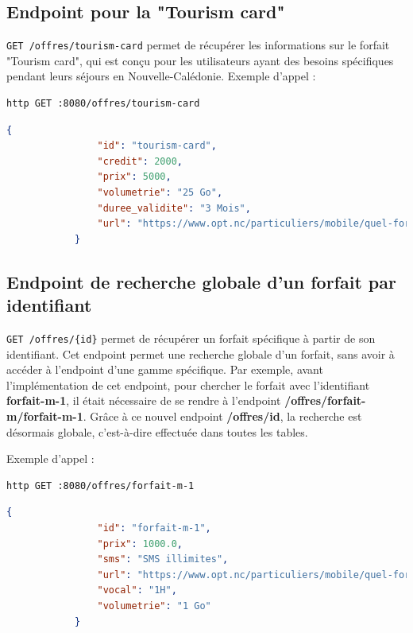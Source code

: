 \documentclass[11pt]{article}
\begin{document}
		\subsection*{Endpoint pour la "Tourism card"}
		\texttt{GET /offres/tourism-card} permet de récupérer les informations sur le forfait "Tourism card", qui est conçu pour les utilisateurs ayant des besoins spécifiques pendant leurs séjours en Nouvelle-Calédonie.
		Exemple d'appel :
		\begin{lstlisting}[language=bash]
			http GET :8080/offres/tourism-card
		\end{lstlisting}
		\begin{lstlisting}[language=JSON]
			{
				"id": "tourism-card",
				"credit": 2000,
				"prix": 5000,
				"volumetrie": "25 Go",
				"duree_validite": "3 Mois",
				"url": "https://www.opt.nc/particuliers/mobile/quel-forfait-choisir/tourism-card-1000"
			}
		\end{lstlisting}
		
	
		
		\subsection*{Endpoint de recherche globale d'un forfait par identifiant}
		
		\texttt{GET /offres/\{id\}} permet de récupérer un forfait spécifique à partir de son identifiant. Cet endpoint permet une recherche globale d'un forfait, sans avoir à accéder à l'endpoint d'une gamme spécifique. Par exemple, avant l'implémentation de cet endpoint, pour chercher le forfait avec l'identifiant \textbf{forfait-m-1}, il était nécessaire de se rendre à l'endpoint \textbf{/offres/forfait-m/forfait-m-1}. Grâce à ce nouvel endpoint \textbf{/offres/{id}}, la recherche est désormais globale, c'est-à-dire effectuée dans toutes les tables.
	
		
			Exemple d'appel :
		\begin{lstlisting}[language=bash]
			http GET :8080/offres/forfait-m-1
		\end{lstlisting}
		\begin{lstlisting}[language=JSON]
			{
				"id": "forfait-m-1",
				"prix": 1000.0,
				"sms": "SMS illimites",
				"url": "https://www.opt.nc/particuliers/mobile/quel-forfait-choisir/forfait-m-1-go",
				"vocal": "1H",
				"volumetrie": "1 Go"
			}
	
		\end{lstlisting}
		
		
		
\end{document}
